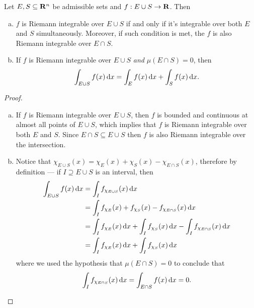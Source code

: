 \begin{proposition}
    \label{prop:domain-relations-riemann-integral}
    Let \(E, S \subseteq \mathbf{R}^n\) be admissible sets and \(f: E \cup S \to \mathbf{R}\). Then
    \begin{enumerate}[(a)]\setlength\itemsep{0em}
        \item \(f\) is Riemann integrable over \(E \cup S\) if and only if it's
              integrable over both \(E\) and \(S\) simultaneously. Moreover, if such
              condition is met, the \(f\) is also Riemann integrable over \(E \cap S\).
        \item If \(f\) is Riemann integrable over \(E \cup S\) \emph{and} \(\mu(E \cap
              S) = 0\), then
              \[
                  \int_{E \cup S} f(x)\, \mathrm{d} x = \int_E f(x)\, \mathrm{d} x + \int_S f(x)\, \mathrm{d} x.
              \]
    \end{enumerate}
\end{proposition}

\begin{proof}
    \begin{enumerate}[(a)]\setlength\itemsep{0em}
        \item If \(f\) is Riemann integrable over \(E \cup S\), then \(f\) is bounded
              and continuous at almost all points of \(E \cup S\), which implies that \(f\)
              is Riemann integrable over both \(E\) and \(S\). Since \(E \cap S \subseteq E
              \cup S\) then \(f\) is also Riemann integrable over the intersection.
        \item Notice that \(\chi_{E \cup S}(x) = \chi_{E}(x) + \chi_S(x) - \chi_{E \cap
                  S}(x)\), therefore by definition --- if \(I \supseteq E \cup S\) is an
              interval, then
              \begin{align*}
                  \int_{E \cup S} f(x)\, \mathrm{d} x
                   & = \int_{I} f_{\chi_{E \cup S}}(x)\, \mathrm{d} x                               \\
                   & = \int_I f_{\chi_E}(x) + f_{\chi_S}(x) - f_{\chi_{E \cap S}}(x)\, \mathrm{d} x \\
                   & = \int_I f_{\chi_E}(x)\, \mathrm{d} x
                  + \int_{I} f_{\chi_S}(x)\, \mathrm{d} x
                  - \int_I f_{\chi_{E \cap S}}(x)\, \mathrm{d} x                                    \\
                   & = \int_I f_{\chi_E}(x)\, \mathrm{d} x
                  + \int_{I} f_{\chi_S}(x)\, \mathrm{d} x
              \end{align*}
              where we used the hypothesis that \(\mu(E \cap S) = 0\) to conclude that
              \[
                  \int_I f_{\chi_{E \cap S}}(x)\, \mathrm{d} x
                  = \int_{E \cap S} f(x)\, \mathrm{d} x = 0.
              \]
    \end{enumerate}
\end{proof}

